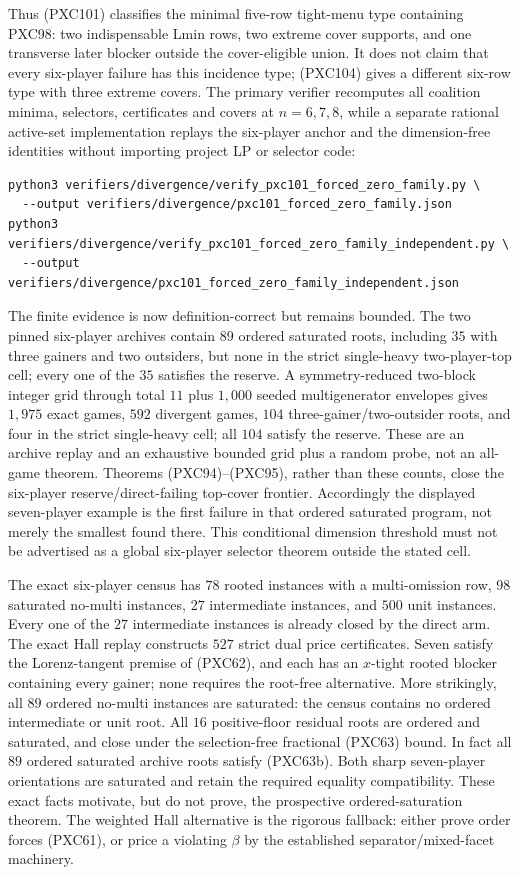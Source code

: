 \documentclass[11pt]{article}
\begin{document}
Thus (PXC101) classifies the minimal five-row tight-menu type containing
PXC98: two indispensable Lmin rows, two extreme cover supports, and one
transverse later blocker outside the cover-eligible union.  It does not
claim that every six-player failure has this incidence type; (PXC104) gives
a different six-row type with three extreme covers.  The primary
verifier recomputes all coalition minima, selectors, certificates and covers
at \(n=6,7,8\), while a separate rational active-set implementation replays
the six-player anchor and the dimension-free identities without importing
project LP or selector code:
\begin{verbatim}
python3 verifiers/divergence/verify_pxc101_forced_zero_family.py \
  --output verifiers/divergence/pxc101_forced_zero_family.json
python3 verifiers/divergence/verify_pxc101_forced_zero_family_independent.py \
  --output verifiers/divergence/pxc101_forced_zero_family_independent.json
\end{verbatim}

The finite evidence is now definition-correct but remains bounded.  The two
pinned six-player archives contain $89$ ordered saturated roots, including
$35$ with three gainers and two outsiders, but none in the strict
single-heavy two-player-top cell; every one of the $35$ satisfies the
reserve.  A symmetry-reduced two-block integer grid through total $11$ plus
$1{,}000$ seeded multigenerator envelopes gives $1{,}975$ exact games,
$592$ divergent games, $104$ three-gainer/two-outsider roots, and four in
the strict single-heavy cell; all $104$ satisfy the reserve.  These are an
archive replay and an exhaustive bounded grid plus a random probe, not an
all-game theorem.  Theorems (PXC94)--(PXC95), rather than these counts, close
the six-player reserve/direct-failing top-cover frontier.  Accordingly the
displayed seven-player example is the first failure in that ordered saturated
program, not merely the smallest found there.  This conditional dimension
threshold must not be advertised as a global six-player selector theorem
outside the stated cell.

The exact six-player census has $78$ rooted instances with a multi-omission
row, $98$ saturated no-multi instances, $27$ intermediate instances, and
$500$ unit instances.  Every one of the $27$ intermediate instances is
already closed by the direct arm.  The exact Hall replay constructs $527$
strict dual price certificates.  Seven satisfy the Lorenz-tangent
premise of (PXC62), and each has an $x$-tight rooted blocker containing every
gainer; none requires the root-free alternative.  More strikingly, all $89$
ordered
no-multi instances are saturated: the census contains no ordered
intermediate or unit root.  All $16$ positive-floor residual roots are
ordered and saturated, and close under the selection-free fractional
(PXC63) bound.  In fact all $89$ ordered saturated archive roots satisfy
(PXC63b).  Both sharp seven-player orientations are saturated and retain the
required equality compatibility.  These exact facts motivate, but do not prove, the prospective
ordered-saturation theorem.  The weighted Hall alternative is the rigorous
fallback: either prove order forces (PXC61), or price a violating $\beta$ by
the established separator/mixed-facet machinery.
\end{document}
